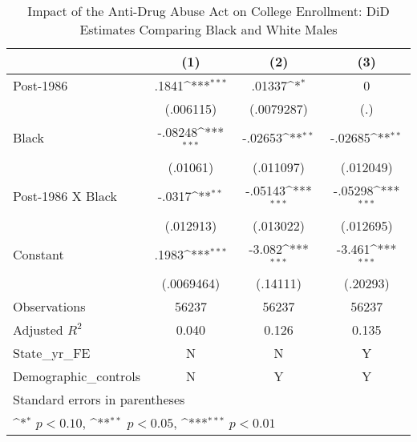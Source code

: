 \begin{table}[htbp]\centering
\def\sym#1{\ifmmode^{#1}\else\(^{#1}\)\fi}
\caption{Impact of the Anti-Drug Abuse Act on College Enrollment: DiD Estimates Comparing Black and White Males}
\begin{tabular}{l*{3}{c}}
\hline\hline
                    &\multicolumn{1}{c}{(1)}         &\multicolumn{1}{c}{(2)}         &\multicolumn{1}{c}{(3)}         \\
\hline
Post-1986           &       .1841\sym{***}&      .01337\sym{*}  &           0         \\
                    &   (.006115)         &  (.0079287)         &         (.)         \\
[1em]
Black               &     -.08248\sym{***}&     -.02653\sym{**} &     -.02685\sym{**} \\
                    &    (.01061)         &   (.011097)         &   (.012049)         \\
[1em]
Post-1986 X Black   &      -.0317\sym{**} &     -.05143\sym{***}&     -.05298\sym{***}\\
                    &   (.012913)         &   (.013022)         &   (.012695)         \\
[1em]
Constant            &       .1983\sym{***}&      -3.082\sym{***}&      -3.461\sym{***}\\
                    &  (.0069464)         &    (.14111)         &    (.20293)         \\
\hline
Observations        &       56237         &       56237         &       56237         \\
Adjusted \(R^{2}\)  &       0.040         &       0.126         &       0.135         \\
State\_yr\_FE         &           N         &           N         &           Y         \\
Demographic\_controls&           N         &           Y         &           Y         \\
\hline\hline
\multicolumn{4}{l}{\footnotesize Standard errors in parentheses}\\
\multicolumn{4}{l}{\footnotesize \sym{*} \(p<0.10\), \sym{**} \(p<0.05\), \sym{***} \(p<0.01\)}\\
\end{tabular}
\end{table}
